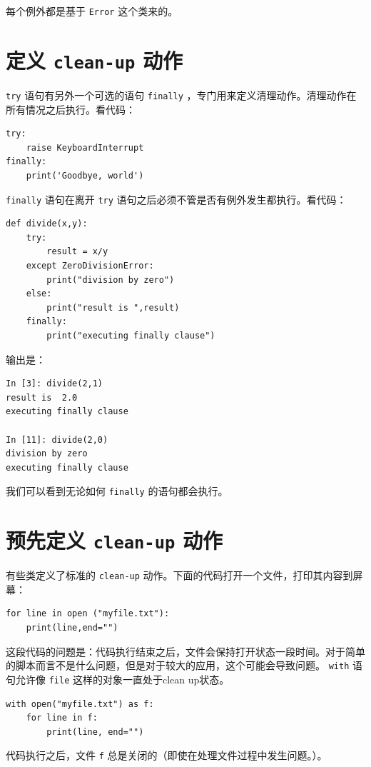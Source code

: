\documentclass[10pt,a4paper,UTF8]{article}
\begin{document}
每个例外都是基于 \texttt{Error} 这个类来的。

\section{定义 \texttt{clean-up} 动作}
\label{sec:orgec5b440}


\texttt{try} 语句有另外一个可选的语句 \texttt{finally} ，专门用来定义清理动作。清理动作在所有情况之后执行。看代码：

\lstset{language=Python,label= ,caption= ,captionpos=b,numbers=none}
\begin{lstlisting}
try:
    raise KeyboardInterrupt
finally:
    print('Goodbye, world')
\end{lstlisting}

\texttt{finally} 语句在离开 \texttt{try} 语句之后必须不管是否有例外发生都执行。看代码：
\lstset{language=Python,label= ,caption= ,captionpos=b,firstnumber=1,numbers=left}
\begin{lstlisting}
def divide(x,y):
    try:
        result = x/y
    except ZeroDivisionError:
        print("division by zero")
    else:
        print("result is ",result)
    finally:
        print("executing finally clause")
\end{lstlisting}
输出是：

\begin{verbatim}
In [3]: divide(2,1)
result is  2.0
executing finally clause

In [11]: divide(2,0)
division by zero
executing finally clause
\end{verbatim}

我们可以看到无论如何 \texttt{finally} 的语句都会执行。

\section{预先定义 \texttt{clean-up} 动作}
\label{sec:org0721662}


有些类定义了标准的 \texttt{clean-up} 动作。下面的代码打开一个文件，打印其内容到屏幕：
\lstset{language=Python,label= ,caption= ,captionpos=b,numbers=none}
\begin{lstlisting}
for line in open ("myfile.txt"):
    print(line,end="")
\end{lstlisting}

这段代码的问题是：代码执行结束之后，文件会保持打开状态一段时间。对于简单的脚本而言不是什么问题，但是对于较大的应用，这个可能会导致问题。  \texttt{with} 语句允许像 \texttt{file} 这样的对象一直处于clean up状态。

\lstset{language=Python,label= ,caption= ,captionpos=b,firstnumber=1,numbers=left}
\begin{lstlisting}
with open("myfile.txt") as f:
    for line in f:
        print(line, end="")
\end{lstlisting}

代码执行之后，文件 \texttt{f} 总是关闭的（即使在处理文件过程中发生问题。）。
\end{document}
